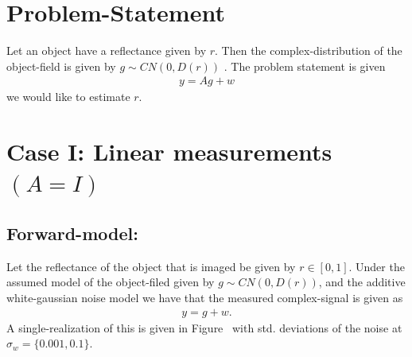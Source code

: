 \documentclass[a4paper, 11pt]{article}
\begin{document}
\section*{Problem-Statement}
Let an object have a reflectance given by $r$. Then the complex-distribution of the object-field is given by $g\sim CN(0,D(r))$ \cite{CaseyOpticallyCoherent}. The problem statement is given 
\begin{eqnarray*}
y=Ag+w
\end{eqnarray*}
we would like to estimate $r$.
\section{Case I: Linear measurements $(A=I)$}
\subsection{Forward-model: }
Let the reflectance of the object that is imaged be given by $r\in[0,1]$. Under the assumed model of the object-filed given by $g\sim CN(0,D(r))$, and the additive white-gaussian noise model we have that the measured complex-signal is given as 
\begin{eqnarray*}
y=g+w.
\end{eqnarray*}
A single-realization of this is given in Figure~\label{fig:forwardModel} with std. deviations of the noise at $\sigma_w=\{0.001,0.1\}$. 
\end{document}
